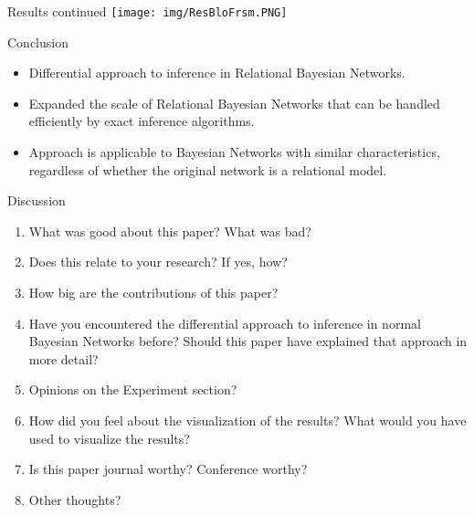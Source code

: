 \documentclass[xcolor={table}]{beamer}
\begin{document}
\begin{frame}{Results continued}
\texttt{[image: img/ResBloFrsm.PNG]}
\end{frame}

\begin{frame}{Conclusion}
\begin{itemize}
\item Differential approach to inference in Relational Bayesian Networks.
\item Expanded the scale of Relational Bayesian Networks that can be handled efficiently by exact inference algorithms.
\item Approach is applicable to Bayesian Networks with similar characteristics, regardless of whether the original network is a relational model.
\end{itemize}
\end{frame}

\begin{frame}{Discussion}
\begin{enumerate}
\item What was good about this paper? What was bad?
\item Does this relate to your research? If yes, how?
\item How big are the contributions of this paper?
\item Have you encountered the differential approach to inference in normal Bayesian Networks before? Should this paper have explained that approach in more detail?
\item Opinions on the Experiment section?
\item How did you feel about the visualization of the results? What would you have used to visualize the results?
\item Is this paper journal worthy? Conference worthy?
\item Other thoughts?
\end{enumerate}
\end{frame}
\end{document}
